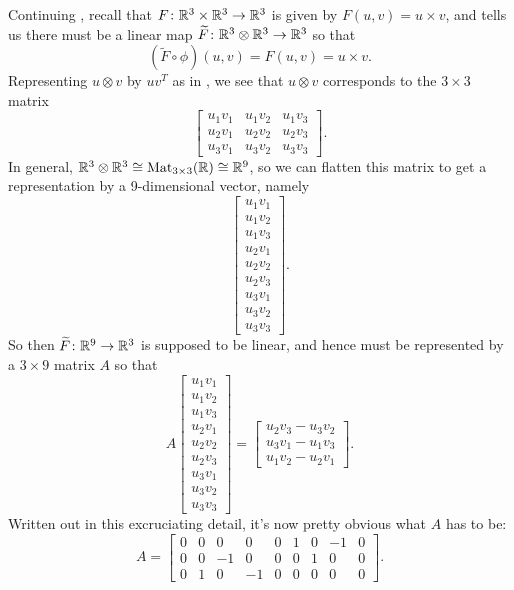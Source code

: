 \begin{example}
	Continuing , recall that $F\colon\thinspace\! \mathbb{R}^3 \times \mathbb{R}^3 \to \mathbb{R}^3$ is given by $F(u,v) = u \times v$, and  tells us there must be a linear map $\widetilde{F}\colon\thinspace\! \mathbb{R}^3 \otimes \mathbb{R}^3 \to \mathbb{R}^3$ so that
	\[
		(\widetilde{F} \circ \phi)(u,v) = F(u,v) = u \times v.
	\]
	Representing $u \otimes v$ by $u v^T$ as in , we see that $u \otimes v$ corresponds to the $3 \times 3$ matrix 
	\[
		\begin{bmatrix}  u_1 v_1 & u_1 v_2 & u_1 v_3 \\
 u_2 v_1 & u_2 v_2 & u_2 v_3 \\
 u_3 v_1 & u_3 v_2 & u_3 v_3 \end{bmatrix}.
	\]
	In general, $\mathbb{R}^3 \otimes \mathbb{R}^3 \cong \operatorname{Mat}_{3 \times 3}(\mathbb{R}) \cong \mathbb{R}^9$, so we can flatten this matrix to get a representation by a 9-dimensional vector, namely
	\[
		\begin{bmatrix}u_1 v_1 \\
 u_1 v_2 \\
 u_1 v_3 \\
 u_2 v_1 \\
 u_2 v_2 \\
 u_2 v_3 \\
 u_3 v_1 \\
 u_3 v_2 \\
 u_3 v_3\end{bmatrix}.
	\]
	So then $\widetilde{F}\colon\thinspace\! \mathbb{R}^9 \to \mathbb{R}^3$ is supposed to be linear, and hence must be represented by a $3 \times 9$ matrix $A$ so that
	\[
		A \begin{bmatrix}u_1 v_1 \\
 u_1 v_2 \\
 u_1 v_3 \\
 u_2 v_1 \\
 u_2 v_2 \\
 u_2 v_3 \\
 u_3 v_1 \\
 u_3 v_2 \\
 u_3 v_3\end{bmatrix}  = \begin{bmatrix} u_2 v_3 - u_3 v_2 \\ u_3 v_1 - u_1 v_3 \\ u_1 v_2 - u_2 v_1 \end{bmatrix}.
	\]
	Written out in this excruciating detail, it's now pretty obvious what $A$ has to be:
	\[
		A = \begin{bmatrix} 0 & 0 & 0 & 0 & 0 & 1 & 0 & -1 & 0 \\ 0 & 0 & -1 & 0 & 0 & 0 & 1 & 0 & 0 \\ 0 & 1 & 0 & -1 & 0 & 0 & 0 & 0 & 0 \end{bmatrix}.
	\]
\end{example}

